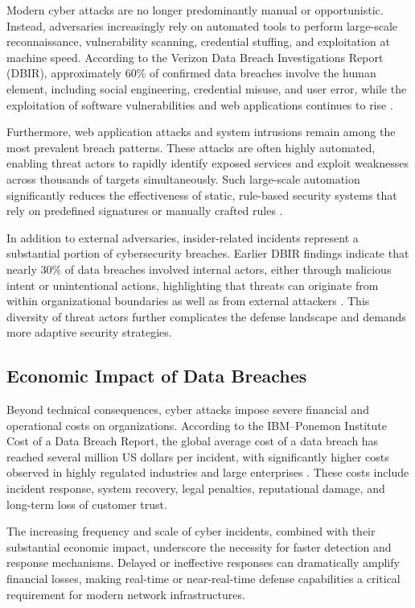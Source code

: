 \documentclass[12pt,a4paper]{report}
\begin{document}
Modern cyber attacks are no longer predominantly manual or opportunistic.
Instead, adversaries increasingly rely on automated tools to perform large-scale reconnaissance, vulnerability scanning, credential stuffing, and exploitation at machine speed.
According to the Verizon Data Breach Investigations Report (DBIR), approximately 60\% of confirmed data breaches involve the human element, including social engineering, credential misuse, and user error, while the exploitation of software vulnerabilities and web applications continues to rise \cite{verizonDBIR2025}.

Furthermore, web application attacks and system intrusions remain among the most prevalent breach patterns.
These attacks are often highly automated, enabling threat actors to rapidly identify exposed services and exploit weaknesses across thousands of targets simultaneously.
Such large-scale automation significantly reduces the effectiveness of static, rule-based security systems that rely on predefined signatures or manually crafted rules \cite{verizonDBIR2024}.

In addition to external adversaries, insider-related incidents represent a substantial portion of cybersecurity breaches.
Earlier DBIR findings indicate that nearly 30\% of data breaches involved internal actors, either through malicious intent or unintentional actions, highlighting that threats can originate from within organizational boundaries as well as from external attackers \cite{verizonDBIR2020}.
This diversity of threat actors further complicates the defense landscape and demands more adaptive security strategies.

\subsection{Economic Impact of Data Breaches}

Beyond technical consequences, cyber attacks impose severe financial and operational costs on organizations.
According to the IBM–Ponemon Institute Cost of a Data Breach Report, the global average cost of a data breach has reached several million US dollars per incident, with significantly higher costs observed in highly regulated industries and large enterprises \cite{ibmPonemon2024}.
These costs include incident response, system recovery, legal penalties, reputational damage, and long-term loss of customer trust.

The increasing frequency and scale of cyber incidents, combined with their substantial economic impact, underscore the necessity for faster detection and response mechanisms.
Delayed or ineffective responses can dramatically amplify financial losses, making real-time or near-real-time defense capabilities a critical requirement for modern network infrastructures.
\end{document}
